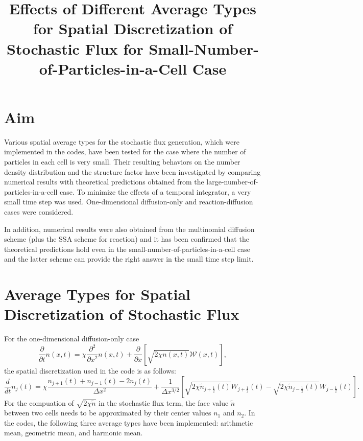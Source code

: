 \documentclass{article}
\begin{document}
\title{Effects of Different Average Types for Spatial Discretization of Stochastic Flux for Small-Number-of-Particles-in-a-Cell Case}

\date{}

\maketitle

\section{Aim}

Various spatial average types for the stochastic flux generation, which were implemented in the codes, have been tested for the case where the number of particles in each cell is very small.
Their resulting behaviors on the number density distribution and the structure factor have been investigated by comparing numerical results with theoretical predictions obtained from the large-number-of-particles-in-a-cell case.
To minimize the effects of a temporal integrator, a very small time step was used.
One-dimensional diffusion-only and reaction-diffusion cases were considered. 

In addition, numerical results were also obtained from the multinomial diffusion scheme (plus the SSA scheme for reaction) and it has been confirmed that the theoretical predictions hold even in the small-number-of-particles-in-a-cell case and the latter scheme can provide the right answer in the small time step limit.

\section{Average Types for Spatial Discretization of Stochastic Flux}

For the one-dimensional diffusion-only case
\begin{equation}
\frac{\partial}{\partial t}n(x,t)=\chi\frac{\partial^2}{\partial x^2}n(x,t)+\frac{\partial}{\partial x}\left[\sqrt{2\chi n(x,t)} \bm{\mathcal{W}}(x,t)\right],
\end{equation}
the spatial discretization used in the code is as follows:
\begin{equation}
\frac{d}{dt}n_j(t) = \chi \frac{n_{j+1}(t)+n_{j-1}(t)-2n_j(t)}{\Delta x^2}
+\frac{1}{\Delta x^{3/2}}\left[
\sqrt{2\chi\tilde{n}_{j+\frac12}(t)} W_{j+\frac12}(t)
-\sqrt{2\chi\tilde{n}_{j-\frac12}(t)} W_{j-\frac12}(t)
\right].
\end{equation}
For the compuation of $\sqrt{2\chi \tilde{n}}$ in the stochastic flux term, the face value $\tilde{n}$ between two cells needs to be approximated by their center values $n_1$ and $n_2$.
In the codes, the following three average types have been implemented: arithmetic mean, geometric mean, and harmonic mean.
\end{document}
